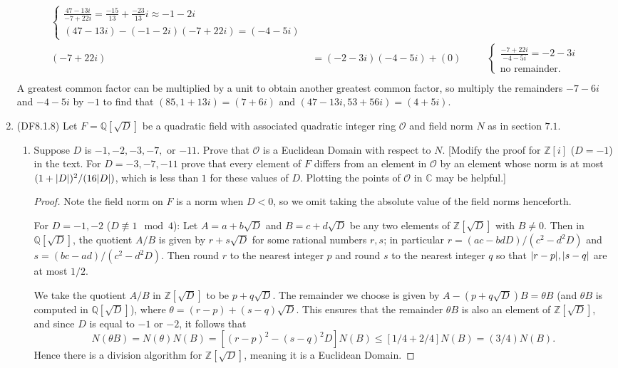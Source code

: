 \documentclass[11pt]{article}
\begin{document}
\begin{enumerate}
\begin{align*}
\begin{cases}
        \frac{47 -13i}{-7 + 22 i} =\frac{-15}{13} + \frac{-23}{13}i \approx -1-2i\\
        (47 -13i) - (-1-2i)(-7 + 22 i) = (-4-5i)
      \end{cases} \\
      (-7 + 22 i) &= (-2-3i)(-4-5i) + (0) &\quad &\begin{cases}
        \frac{-7 + 22 i}{-4-5i} = -2-3i\\
        \text{no remainder}.
      \end{cases} \\
    \end{align*}
    A greatest common factor can be multiplied by a unit to obtain another greatest common factor, so multiply the remainders $-7-6i$ and $-4-5i$ by $-1$ to find that $(85, 1+13i) = (7+6i)$ and $(47-13i, 53+56i) = (4+5i)$.
    \item (DF8.1.8) Let $F = \mathbb{Q}[\sqrt{D}]$ be a quadratic field with associated quadratic integer ring $\mathcal{O}$ and field norm $N$ as in section $7.1$. \begin{enumerate}[label=(\alph*)]
        \item Suppose $D$ is $-1, -2, -3, -7,$ or $-11$. Prove that $\mathcal{O}$ is a Euclidean Domain with respect to $N$. [Modify the proof for $\mathbb{Z}[i]$ ($D=-1$) in the text. For $D = -3, -7, -11$ prove that every element of $F$ differs from an element in $\mathcal{O}$ by an element whose norm is at most $(1+\abs{D})^2/(16\abs{D})$, which is less than $1$ for these values of $D$. Plotting the points of $\mathcal{O}$ in $\mathbb{C}$ may be helpful.]
        \begin{proof} Note the field norm on $F$ is a norm when $D < 0$, so we omit taking the absolute value of the field norms henceforth.

        For $D = -1,-2$ ($D\not\equiv 1 \mod 4$):
        Let $A = a+b\sqrt{D}$ and $B = c+d\sqrt{D}$ be any two elements of $\mathbb{Z}[\sqrt{D}]$ with $B\neq 0$. Then in $\mathbb{Q}[\sqrt{D}]$, the quotient $A/B$ is given by $r+s\sqrt{D}$ for some rational numbers $r,s$; in particular $r = (ac-bdD)/(c^2-d^2D)$ and $s = (bc-ad)/(c^2-d^2D)$. Then round $r$ to the nearest integer $p$ and round $s$ to the nearest integer $q$ so that $\abs{r-p},\abs{s-q}$ are at most $1/2$.
        
        We take the quotient $A/B$ in $\mathbb{Z}[\sqrt{D}]$ to be $p+q\sqrt{D}$. The remainder we choose is given by $A- (p+q\sqrt{D})B = \theta B$ (and $\theta B$ is computed in $\mathbb{Q}[\sqrt{D}]$), where $\theta = (r-p) + (s-q)\sqrt{D}$. This ensures that the remainder $\theta B$ is also an element of $\mathbb{Z}[\sqrt{D}]$, and since $D$ is equal to $-1$ or $-2$, it follows that \[N(\theta B) = N(\theta)N(B) = [(r-p)^2 - (s-q)^2D]N(B) \leq [1/4 + 2/4]N(B) = (3/4)N(B).\] Hence there is a division algorithm for $\mathbb{Z}[\sqrt{D}]$, meaning it is a Euclidean Domain.


\end{proof}
\end{enumerate}
\end{enumerate}
\end{document}
